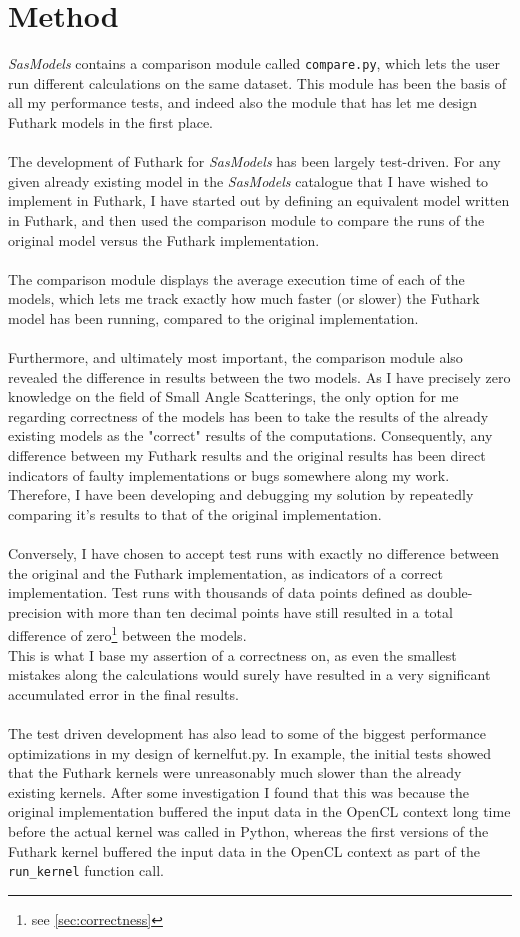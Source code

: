 \documentclass[11pt]{article}
\newcommand{\sasmodels}{\textit{SasModels}}
\begin{document}
\section{Method}
\sasmodels{} contains a comparison module called \texttt{compare.py}, which
lets the user run different calculations on the same dataset.
This module has been the basis of all my performance tests, and indeed also
the module that has let me design Futhark models in the first place.
\\\\
The development of Futhark for \sasmodels{} has been largely test-driven.
For any given already existing model in the \sasmodels{} catalogue that I have
wished to implement in Futhark, I have started out by defining an equivalent
model written in Futhark, and then used the comparison module to compare the
 runs of the original model versus the Futhark implementation.
\\\\
The comparison module displays the average execution time of each of the models,
which lets me track exactly how much faster (or slower) the Futhark model has
been running, compared to the original implementation.
\\\\
Furthermore, and ultimately most important, the comparison module also
revealed the difference in results between the two models. 
As I have precisely zero knowledge on the field of Small Angle Scatterings, 
the only option for me regarding correctness of the models has been to take
the results of the already existing models as the "correct" results of the
computations. Consequently, any difference between my Futhark results and the
original results has been direct indicators of faulty implementations or bugs
somewhere along my work.
Therefore, I have been developing and debugging my solution by repeatedly
comparing it's results to that of the original implementation.
\\\\
Conversely, I have chosen to accept test runs with exactly no difference
between the original and the Futhark implementation, as indicators of a
correct implementation. 
Test runs with thousands of data points defined as double-precision
with more than ten decimal points have still resulted in a total difference of
zero\footnote{see \ref{sec:correctness}} between the models.
\\
This is what I base my assertion of a correctness on, as even the smallest 
mistakes along the calculations would surely have resulted in a very significant
accumulated error in the final results.
\\\\
The test driven development has also lead to some of the biggest performance
optimizations in my design of kernelfut.py.
In example, the initial tests showed that the Futhark kernels were unreasonably
much slower than the already existing kernels. After some investigation I found
that this was because the original implementation buffered the input data in the
OpenCL context long time before the actual kernel was called in Python, whereas
the first versions of the Futhark kernel buffered the input data in the OpenCL
context as part of the \texttt{run\_kernel} function call.
\end{document}
